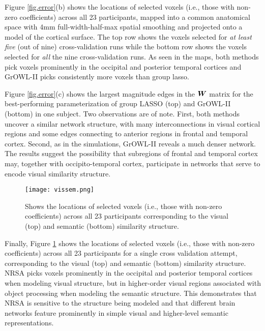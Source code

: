 Figure \ref{fig.error}(b) shows the locations of selected voxels (i.e., those with
non-zero coefficients) across all 23 participants, mapped into a common anatomical space
with 4mm full-width-half-max spatial smoothing and projected onto a model of the cortical
surface. The top row shows the voxels selected for \textit{at least five} (out of nine)
cross-validation runs while the bottom row shows the voxels selected for \textit{all} the
nine cross-validation runs. As seen in the maps, both methods pick voxels prominently in
the occipital and posterior temporal cortices and GrOWL-II picks consistently more voxels
than group lasso.

\iffalse
\begin{figure}[!h]
\centering
\texttt{[image: NW.png]}%
\caption{Network plot showing the top edges from the $\bW$ matrix for the best-performing parameterization of group LASSO (top) and GrOWL-II (bottom) in one subject. The thickness of the edges is proportional to the edge weights.}
\label{fig.NW}
\end{figure}
\fi

Figure \ref{fig.error}(c) shows the largest magnitude edges in the $\bW$ matrix for the
best-performing parameterization of group LASSO (top) and GrOWL-II (bottom) in one
subject. Two observations are of note. First, both methods uncover a similar network
structure, with many interconnections in visual cortical regions and some edges connecting
to anterior regions in frontal and temporal cortex. Second, as in the simulations,
GrOWL-II reveals a much denser network. The results suggest the possibility that
subregions of frontal and temporal cortex may, together with occipito-temporal cortex,
participate in networks that serve to encode visual similarity structure.

\begin{figure}[!h]
\centering
\texttt{[image: vissem.png]}%
\caption{Shows the locations of selected voxels (i.e., those with non-zero coefficients) across all 23 participants corresponding to the visual (top) and semantic (bottom) similarity structure. }
\label{fig.vissem}
\end{figure}

Finally, Figure \ref{fig.vissem} shows the locations of selected voxels (i.e., those with
non-zero coefficients) across all 23 participants for a single cross validation attempt,
corresponding to the visual (top) and semantic (bottom) similarity structure. NRSA picks
voxels prominently in the occipital and posterior temporal cortices when modeling visual
structure, but in higher-order visual regions associated with object processing when
modeling the semantic structure. This demonstrates that NRSA is sensitive to the structure
being modeled and that different brain networks feature prominently in simple visual and
higher-level semantic representations.





